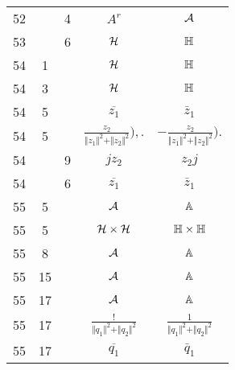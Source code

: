 \documentclass[a4paper,11pt]{article}
\begin{document}
\begin{center}
\begin{tabular}{|c|c|c|c|c|}
    52  & &  4 & $A^{ r }$ & $\mathcal{A}$ \\
    53  & &  6 & $\mathcal{H}$ & $\mathbb{H}$ \\
    54  &  1 & & $\mathcal{H}$ & $\mathbb{H}$ \\
    54  &  3 & & $\mathcal{H}$ & $\mathbb{H}$ \\
    54  &  5 & & $\overline{ z_{ 1 } }$ & $\bar{ z }_{ 1 }$ \\
    54  &  5 & & $\frac{ z_{ 2 } }
                 { \Vert z_{ 1 } \Vert^{ 2 } + \Vert z_{ 2 } \Vert^{ 2 } } ),.$
           & $-\frac{ z_{ 2 } }
             { \Vert z_{ 1 } \Vert^{ 2 } + \Vert z_{ 2 } \Vert^{ 2 } } ).$ \\
    54  & &  9 & $j z_{ 2 }$ & $z_{ 2 } j$ \\
    54  & &  6 & $\overline{ z_{ 1 } }$ & $\bar{ z }_{ 1 }$ \\
    55  &  5 & & $\mathcal{A}$ & $\mathbb{A}$ \\
    55  &  5 & & $\mathcal{H} \times \mathcal{H}$ & $\mathbb{H} \times \mathbb{H}$ \\
    55  &  8 & & $\mathcal{A}$ & $\mathbb{A}$ \\
    55  & 15 & & $\mathcal{A}$ & $\mathbb{A}$ \\
    55  & 17 & & $\mathcal{A}$ & $\mathbb{A}$ \\
    55  & 17 & & $\frac{ ! }
                 { \Vert q_{ 1 } \Vert^{ 2 } + \Vert q_{ 2 } \Vert^{ 2 } }$
           & $\frac{ 1 }
             { \Vert q_{ 1 } \Vert^{ 2 } + \Vert q_{ 2 } \Vert^{ 2 } }$ \\
    55  & 17 & & $\overline{ q_{ 1 } }$ & $\bar{ q }_{ 1 }$ \\
    \hline
  \end{tabular}


\end{center}
\end{document}
